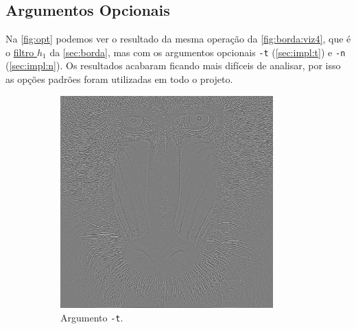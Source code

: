 \subsection{Argumentos Opcionais}

    Na \cref{fig:opt} podemos ver o resultado da mesma operação da \cref{fig:borda:viz4}, que é o \hyperref[fig:h1]{filtro $h_1$} da \cref{sec:borda}, mas com os argumentos opcionais \texttt{-t} (\cref{sec:impl:t}) e \texttt{-n} (\cref{sec:impl:n}). Os resultados acabaram ficando mais difíceis de analisar, por isso as opções padrões foram utilizadas em todo o projeto.

    \begin{figure}[H]
        \centering
        \begin{subfigure}{0.48\textwidth}
            \centering
            \includegraphics[width=0.9\textwidth]{resultados/baboon_h1t.png}
            \caption{Argumento \texttt{-t}.}
            \label{fig:opt:t}
        \end{subfigure}%
        \begin{subfigure}{0.48\textwidth}
            \centering

\end{subfigure}
\end{figure}
